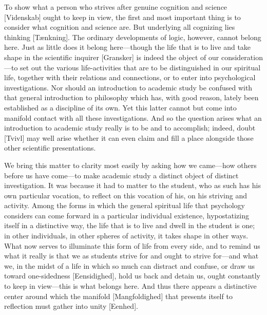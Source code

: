 \documentclass[12pt,a4paper]{book}
\begin{document}
To show what a person who strives after genuine cognition and science
[Videnskab] ought to keep in view, the first and most important thing is to
consider what cognition and science are. But underlying all cognizing lies
thinking [Tænkning]. The ordinary developments of logic, however, cannot belong
here. Just as little does it belong here---though the life that is to live and
take shape in the scientific inquirer [Gransker] is indeed the object of our
consideration---to set out the various life-activities that are to be
distinguished in our spiritual life, together with their relations and
connections, or to enter into psychological investigations. Nor should an
introduction to academic study be confused with that general introduction to
philosophy which has, with good reason, lately been established as a discipline
of its own. Yet this latter cannot but come into manifold contact with all
these investigations. And so the question arises what an introduction to
academic study really is to be and to accomplish; indeed, doubt [Tvivl] may
well arise whether it can even claim and fill a place alongside those other
scientific presentations.

We bring this matter to clarity most easily by asking how we came---how others
before us have come---to make academic study a distinct object of distinct
investigation. It was because it had to matter to the student, who as such has
his own particular vocation, to reflect on this vocation of his, on his
striving and activity. Among the forms in which the general spiritual life that
psychology considers can come forward in a particular individual existence,
hypostatizing itself in a distinctive way, the life that is to live and dwell
in the student is one; in other individuals, in other spheres of activity, it
takes shape in other ways. What now serves to illuminate this form of life from
every side, and to remind us what it really is that we as students strive for
and ought to strive for---and what we, in the midst of a life in which so much
can distract and confuse, or draw us toward one-sidedness [Eensidighed], hold
us back and detain us, ought constantly to keep in view---this is what belongs
here. And thus there appears a distinctive center around which the manifold
[Mangfoldighed] that presents itself to reflection must gather into unity
[Eenhed].
\end{document}

